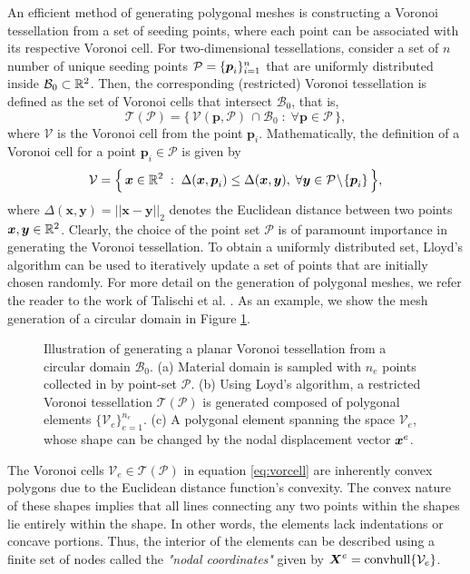 An efficient method of generating polygonal meshes is constructing a Voronoi tessellation from a set of seeding points, where each point can be associated with its respective Voronoi cell. For two-dimensional tessellations, consider a set of $n$ number of unique seeding points $\mathcal{P} = \{ {\boldsymbol{p}}_i \}^n_{i = 1}$ that are uniformly distributed inside $\mathcal{B}_0 \subset \mathbb{R}^2$. Then, the corresponding (restricted) Voronoi tessellation is defined as the set of Voronoi cells that intersect $\mathcal{B}_0$, that is, 
%
\begin{equation}
\mathcal{T}(\mathcal{P}) = \Big\{\, \mathcal{V}(\boldsymbol{p},\mathcal{P}) \,\cap \mathcal{B}_0 \;:\; \forall \boldsymbol{p} \in \mathcal{P} \,\Big\},
\end{equation}
%
where $\mathcal{V}$ is the Voronoi cell from the point $\boldsymbol{p}_i$. Mathematically, the definition of a Voronoi cell for a point $\boldsymbol{p}_i \in \mathcal{P}$ is given by
%
\begin{equation}
\mathcal{V} = \Big\{\, \boldsymbol{x}\in \mathbb{R}^2 \;:\; \Delta(\boldsymbol{x},\boldsymbol{p}_i) \le \Delta(\boldsymbol{x},\boldsymbol{y}),\; \forall \boldsymbol{y} \in \mathcal{P}\!\setminus\!\{\boldsymbol{p}_i\}  \,\Big\}, \label{eq:vorcell}
\end{equation}
%
where $\Delta(\boldsymbol{x},\boldsymbol{y}) = ||\boldsymbol{x} -  \boldsymbol{y}||_2$ denotes the Euclidean distance between two points $\boldsymbol{x},\boldsymbol{y}\in \mathbb{R}^2$. Clearly, the choice of the point set $\mathcal{P}$ is of paramount importance in generating the Voronoi tessellation. To obtain a uniformly distributed set, Lloyd's algorithm can be used to iteratively update a set of points that are initially chosen randomly. For more detail on the generation of polygonal meshes, we refer the reader to the work of Talischi et al. \cite{Talischi2012}. As an example, we show the mesh generation of a circular domain in Figure \ref{fig:C3:voronoimeshExample}.  
%
\begin{figure}
\centering
\vspace{-2mm}

\caption{Illustration of generating a planar Voronoi tessellation from a circular domain $\mathcal{B}_0$. (a) Material domain is sampled with $n_e$ points collected in by point-set $\mathcal{P}$. (b) Using Loyd's algorithm, a restricted Voronoi tessellation $\mathcal{T}(\mathcal{P})$ is generated composed of polygonal elements $\{\mathcal{V}_e\}_{e=1}^{n_e}$. (c) A polygonal element spanning the space $\mathcal{V}_e$, whose shape can be changed by the nodal displacement vector ${\boldsymbol{x}}^{e}$. \label{fig:C3:voronoimeshExample}}
\vspace{-3mm}
\end{figure}
%
The Voronoi cells $\mathcal{V}_e \in \mathcal{T}(\mathcal{P})$ in equation \eqref{eq:vorcell} are inherently convex polygons due to the Euclidean distance function's convexity. The convex nature of these shapes implies that all lines connecting any two points within the shapes lie entirely within the shape. In other words, the elements lack indentations or concave portions. Thus, the interior of the elements can be described using a finite set of nodes called the \textit{"nodal coordinates"} given by ${\boldsymbol{X}}^e = \textrm{convhull}\{\mathcal{V}_e\}$. 

